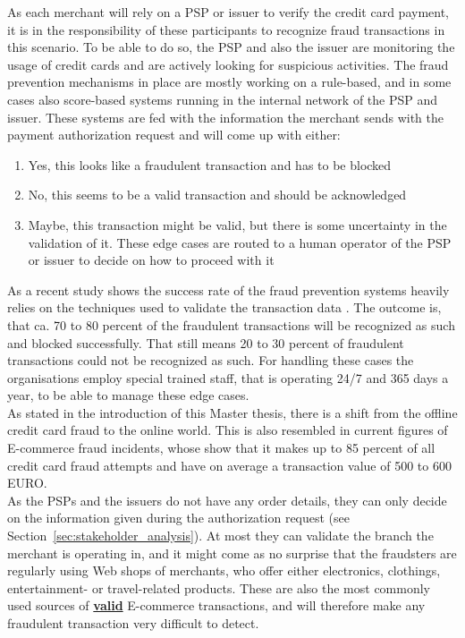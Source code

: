 As each merchant will rely on a \gls{PSP} or issuer to verify the credit card payment, it is in the responsibility of these participants to recognize fraud transactions in this scenario. To be able to do so, the \gls{PSP} and also the issuer are monitoring the usage of credit cards and are actively looking for suspicious activities. The fraud prevention mechanisms in place are mostly working on a rule-based, and in some cases also score-based systems running in the internal network of the \gls{PSP} and issuer. These systems are fed with the information the merchant sends with the payment authorization request and will come up with either:\@

\begin{enumerate}
  \item Yes, this looks like a fraudulent transaction and has to be blocked
  \item No, this seems to be a valid transaction and should be acknowledged
  \item Maybe, this transaction might be valid, but there is some uncertainty in the validation of it. These edge cases are routed to a human operator of the \gls{PSP} or issuer to decide on how to proceed with it
\end{enumerate}

As a recent study shows the success rate of the fraud prevention systems heavily relies on the techniques used to validate the transaction data \citep{rana2015survey}. The outcome is, that ca. 70 to 80 percent of the fraudulent transactions will be recognized as such and blocked successfully. That still means 20 to 30 percent of fraudulent transactions could not be recognized as such. For handling these cases the organisations employ special trained staff, that is operating 24/7 and 365 days a year, to be able to manage these edge cases. \\

As stated in the introduction of this Master thesis, there is a shift from the offline credit card fraud to the online world. This is also resembled in current figures of E-commerce fraud incidents, whose show that it makes up to 85 percent of all credit card fraud attempts and have on average a transaction value of 500 to 600 EURO.\\

As the \gls{PSP}s and the issuers do not have any order details, they can only decide on the information given during the authorization request (see Section~\ref{sec:stakeholder_analysis}). At most they can validate the branch the merchant is operating in, and it might come as no surprise that the fraudsters are regularly using Web shops of merchants, who offer either electronics, clothings, entertainment- or travel-related products. These are also the most commonly used sources of \textbf{\underline{valid}} E-commerce transactions, and will therefore make any fraudulent transaction very difficult to detect. \\

